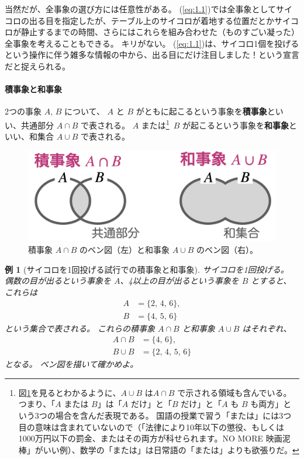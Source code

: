 \documentclass[12pt]{ltjsarticle}\usepackage{ifthen}\newcounter{enlarge}\setcounter{enlarge}{1}
\newtheorem{eg}{例}
\begin{document}
当然だが、全事象の選び方には任意性がある。
(\ref{eq:1.1})では全事象としてサイコロの出る目を指定したが、テーブル上のサイコロが着地する位置だとかサイコロが静止するまでの時間、さらにはこれらを組み合わせた（ものすごい凝った）全事象を考えることもできる。
キリがない。
(\ref{eq:1.1})は、サイコロ1個を投げるという操作に伴う雑多な情報の中から、出る目にだけ注目しました！という宣言だと捉えられる。

\paragraph{積事象と和事象}

2つの事象 $A,\, B$ について、 $A$ と $B$ がともに起こるという事象を\textbf{積事象}といい、共通部分 $A \cap B$ で表される。
$A$ または\footnote{%
  図\ref{f:1.1}を見るとわかるように、$A \cup B$ は$A \cap B$ で示される領域も含んでいる。
  つまり、「$A$ または $B$」は「$A$ だけ」と「$B$ だけ」と「$A$ も $B$ も両方」という3つの場合を含んだ表現である。
  国語の授業で習う「または」には3つ目の意味は含まれていないので（「法律により10年以下の懲役、もしくは1000万円以下の罰金、またはその両方が科せられます。NO MORE 映画泥棒」がいい例）、数学の「または」は日常語の「または」よりも欲張りだ。
}\
$B$ が起こるという事象を\textbf{和事象}といい、和集合 $A \cup B$ で表される。

\begin{figure}[] 
\centering 
\includegraphics[width=10truecm]{./figure/f1-1.png}
\captionsetup{width=.9\linewidth}
\caption{%
  積事象 $A \cap B$ のベン図（左）と和事象 $A \cup B$ のベン図（右）。
}
\label{f:1.1}
\end{figure}

\begin{eg}[サイコロを1回投げる試行での積事象と和事象]
  サイコロを1回投げる。
  偶数の目が出るという事象を $A$、4以上の目が出るという事象を $B$ とすると、これらは
  \begin{align}
    A &= \{2,\, 4,\, 6 \}, \label{eq:1.3} \\
    B &= \{4,\, 5,\, 6 \} \label{eq:1.4}
  \end{align}
  という集合で表される。
  これらの積事象 $A \cap B$ と和事象 $A \cup B$ はそれぞれ、
  \begin{align}
    A \cap B &= \{4,\, 6 \}, \label{eq:1.5} \\
    B \cup B &= \{2,\, 4,\, 5,\, 6 \} \label{eq:1.6}
  \end{align}
  となる。
  ベン図を描いて確かめよ。
\end{eg}
\end{document}
